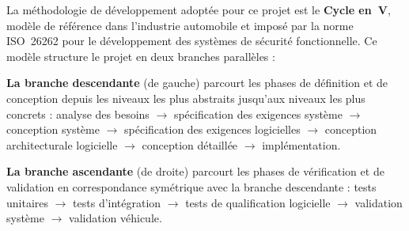 \documentclass[12pt,a4paper]{report}
\begin{document}
La m\'ethodologie de d\'eveloppement adopt\'ee pour ce projet est le \textbf{Cycle en~V}, mod\`ele de r\'ef\'erence dans l'industrie automobile et impos\'e par la norme ISO~26262 pour le d\'eveloppement des syst\`emes de s\'ecurit\'e fonctionnelle. Ce mod\`ele structure le projet en deux branches parall\`eles :

\textbf{La branche descendante} (de gauche) parcourt les phases de d\'efinition et de conception depuis les niveaux les plus abstraits jusqu'aux niveaux les plus concrets : analyse des besoins $\rightarrow$ sp\'ecification des exigences syst\`eme $\rightarrow$ conception syst\`eme $\rightarrow$ sp\'ecification des exigences logicielles $\rightarrow$ conception architecturale logicielle $\rightarrow$ conception d\'etaill\'ee $\rightarrow$ impl\'ementation.

\textbf{La branche ascendante} (de droite) parcourt les phases de v\'erification et de validation en correspondance sym\'etrique avec la branche descendante : tests unitaires $\rightarrow$ tests d'int\'egration $\rightarrow$ tests de qualification logicielle $\rightarrow$ validation syst\`eme $\rightarrow$ validation v\'ehicule.
\end{document}
